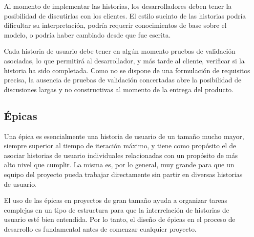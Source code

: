 Al momento de implementar las historias, los desarrolladores deben tener la posibilidad de discutirlas con los clientes. El estilo sucinto de las historias podría dificultar su interpretación, podría requerir conocimientos de base sobre el modelo, o podría haber cambiado desde que fue escrita.

Cada historia de usuario debe tener en algún momento pruebas de validación asociadas, lo que permitirá al desarrollador, y más tarde al cliente, verificar si la historia ha sido completada. Como no se dispone de una formulación de requisitos precisa, la ausencia de pruebas de validación concertadas abre la posibilidad de discusiones largas y no constructivas al momento de la entrega del producto.

\subsection{Épicas}
Una épica es esencialmente una historia de usuario de un tamaño mucho mayor, siempre superior al tiempo de iteración máximo, y tiene como propósito el de asociar historias de usuario individuales relacionadas con un propósito de más alto nivel que cumplir. La misma es, por lo general, muy grande para que un equipo del proyecto pueda trabajar directamente sin partir en diversas historias de usuario\citep{cobb2015project}.

El uso de las épicas en proyectos de gran tamaño ayuda a organizar tareas complejas en un tipo de estructura para que la interrelación de historias de usuario esté bien entendida. Por lo tanto, el diseño de épicas en el proceso de desarrollo es fundamental antes de comenzar cualquier proyecto.